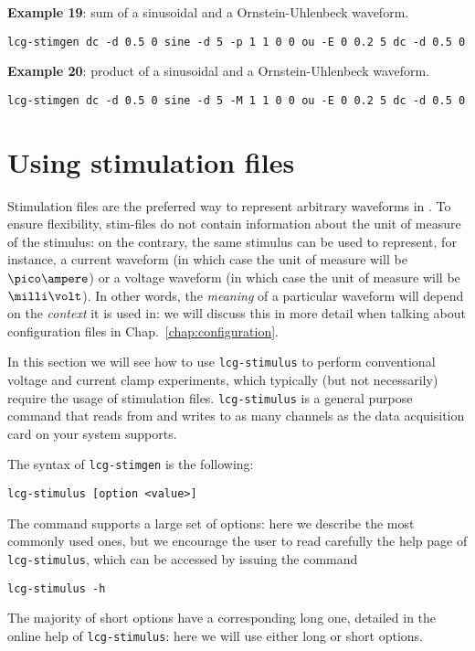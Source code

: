 \textbf{Example 19}: sum of a sinusoidal and a Ornstein-Uhlenbeck
waveform.
\begin{lstlisting}
lcg-stimgen dc -d 0.5 0 sine -d 5 -p 1 1 0 0 ou -E 0 0.2 5 dc -d 0.5 0
\end{lstlisting}

\textbf{Example 20}: product of a sinusoidal and a Ornstein-Uhlenbeck
waveform.
\begin{lstlisting}
lcg-stimgen dc -d 0.5 0 sine -d 5 -M 1 1 0 0 ou -E 0 0.2 5 dc -d 0.5 0
\end{lstlisting}

\section{Using stimulation files}
Stimulation files are the preferred way to represent arbitrary
waveforms in \progname. To ensure flexibility, stim-files do not
contain information about the unit of measure of the stimulus: on the
contrary, the same stimulus can be used to represent, for instance, a
current waveform (in which case the unit of measure will be
$\pico\ampere$) or a voltage waveform (in which case the unit of
measure will be $\milli\volt$). In other words, the \textit{meaning}
of a particular waveform will depend on the \textit{context} it is
used in: we will discuss this in more detail when talking about
configuration files in Chap.~\ref{chap:configuration}.

In this section we will see how to use \verb+lcg-stimulus+ to perform
conventional voltage and current clamp experiments, which typically
(but not necessarily) require the usage of stimulation
files. \verb+lcg-stimulus+ is a general purpose command that
reads from and writes to as many channels as the data acquisition card
on your system supports.

The syntax of \verb+lcg-stimgen+ is the following:
\begin{verbatim}
lcg-stimulus [option <value>]
\end{verbatim}
The command supports a large set of options: here we describe the most
commonly used ones, but we encourage the user to read carefully the
help page of \verb+lcg-stimulus+, which can be accessed by issuing the
command
\begin{lstlisting}
lcg-stimulus -h
\end{lstlisting}
The majority of short options have a corresponding long one, detailed
in the online help of \verb+lcg-stimulus+: here we will use either
long or short options.

